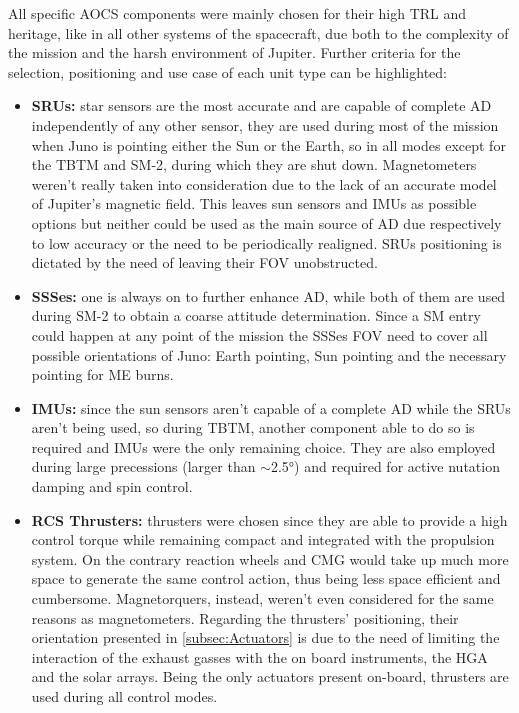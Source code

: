All specific AOCS components were mainly chosen for their high TRL and heritage, like in all other systems of the spacecraft, due both to the complexity of the mission and the harsh environment of Jupiter. Further criteria for the selection, positioning and use case of each unit type can be highlighted:
\begin{itemize}
    \item \textbf{SRUs:} star sensors are the most accurate and are capable of complete AD independently of any other sensor, they are used during most of the mission when Juno is pointing either the Sun or the Earth, so in all modes except for the TBTM and SM-2, during which they are shut down. Magnetometers weren't really taken into consideration due to the lack of an accurate model of Jupiter's magnetic field. This leaves sun sensors and IMUs as possible options but neither could be used as the main source of AD due respectively to low accuracy or the need to be periodically realigned. SRUs positioning is dictated by the need of leaving their FOV unobstructed.
    \item \textbf{SSSes:} one is always on to further enhance AD, while both of them are used during SM-2 to obtain a coarse attitude determination. Since a SM entry could happen at any point of the mission the SSSes FOV need to cover all possible orientations of Juno: Earth pointing, Sun pointing and the necessary pointing for ME burns.
    \item \textbf{IMUs:} since the sun sensors aren't capable of a complete AD while the SRUs aren't being used, so during TBTM, another component able to do so is required and IMUs were the only remaining choice. They are also employed during large precessions (larger than $\sim$2.5°) and required for active nutation damping and spin control. \cite{juno_sito}
    \item \textbf{RCS Thrusters:} thrusters were chosen since they are able to provide a high control torque while remaining compact and integrated with the propulsion system. On the contrary reaction wheels and CMG would take up much more space to generate the same control action, thus being less space efficient and cumbersome. Magnetorquers, instead, weren't even considered for the same reasons as magnetometers. Regarding the thrusters' positioning, their orientation presented in \autoref{subsec:Actuators} is due to the need of limiting the interaction of the exhaust gasses with the on board instruments, the HGA and the solar arrays. Being the only actuators present on-board, thrusters are used during all control modes.
\end{itemize}  

